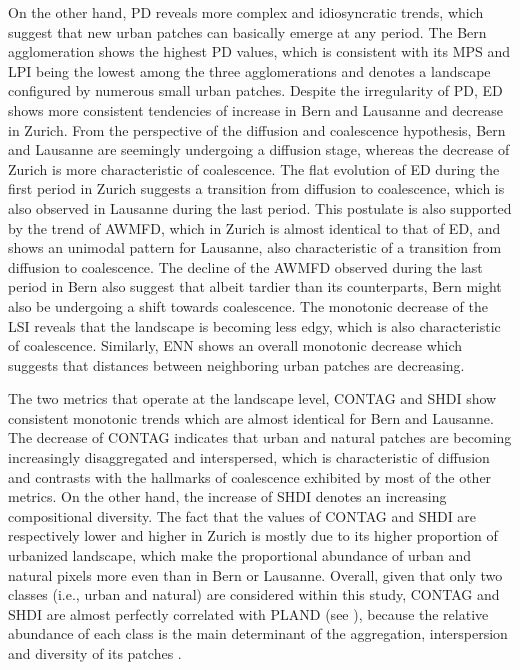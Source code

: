 On the other hand, PD reveals more complex and idiosyncratic trends, which suggest that new urban patches can basically emerge at any period.
The Bern agglomeration shows the highest PD values, which is consistent with its MPS and LPI being the lowest among the three agglomerations and denotes a landscape configured by numerous small urban patches.
Despite the irregularity of PD, ED shows more consistent tendencies of increase in Bern and Lausanne and decrease in Zurich. From the perspective of the diffusion and coalescence hypothesis, Bern and Lausanne are seemingly undergoing a diffusion stage, whereas the decrease of Zurich is more characteristic of coalescence.
The flat evolution of ED during the first period in Zurich suggests a transition from diffusion to coalescence, which is also observed in Lausanne during the last period.
This postulate is also supported by the trend of AWMFD, which in Zurich is almost identical to that of ED, and shows an unimodal pattern for Lausanne, also characteristic of a transition from diffusion to coalescence. The decline of the AWMFD observed during the last period in Bern also suggest that albeit tardier than its counterparts, Bern might also be undergoing a shift towards coalescence.
The monotonic decrease of the LSI reveals that the landscape is becoming less edgy, which is also characteristic of coalescence.
Similarly, ENN shows an overall monotonic decrease which suggests that distances between neighboring urban patches are decreasing.

The two metrics that operate at the landscape level, CONTAG and SHDI show consistent monotonic trends which are almost identical for Bern and Lausanne.
The decrease of CONTAG indicates that urban and natural patches are becoming increasingly disaggregated and interspersed, which is characteristic of diffusion and contrasts with the hallmarks of coalescence exhibited by most of the other metrics.
On the other hand, the increase of SHDI denotes an increasing compositional diversity.
The fact that the values of CONTAG and SHDI are respectively lower and higher in Zurich is mostly due to its higher proportion of urbanized landscape, which make the proportional abundance of urban and natural pixels more even than in Bern or Lausanne.
Overall, given that only two classes (i.e., urban and natural) are considered within this study, CONTAG and SHDI are almost perfectly correlated with PLAND (see ), because the relative abundance of each class is the main determinant of the aggregation, interspersion and diversity of its patches \citep{mcgarigal2012fragstats}.


